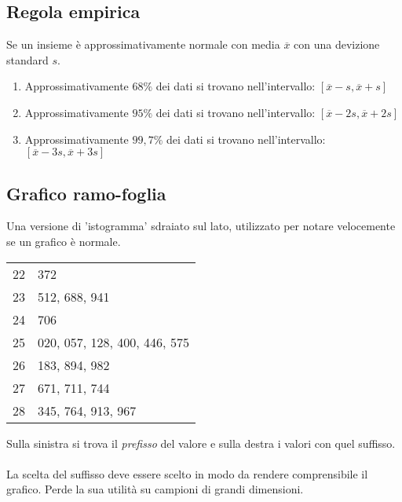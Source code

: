 \documentclass{article}
\begin{document}
\subsection*{Regola empirica}

Se un insieme è approssimativamente normale con media $\overline{x}$ con una devizione standard $s$.

\begin{enumerate}
  \item Approssimativamente $68\%$ dei dati si trovano nell'intervallo: $[\overline{x}-s,\overline{x}+s]$
  \item Approssimativamente $95\%$ dei dati si trovano nell'intervallo: $[\overline{x}-2s,\overline{x}+2s]$
  \item Approssimativamente $99,7\%$ dei dati si trovano nell'intervallo: $[\overline{x}-3s,\overline{x}+3s]$

\end{enumerate}


\subsection*{Grafico ramo-foglia}

Una versione di 'istogramma' sdraiato sul lato, utilizzato per notare velocemente se un grafico è normale.


\hfill

\begin{minipage}[c]{0.35\textwidth}
    \centering
    \begin{tabular}{r|l}
        22 & 372 \\
        23 & 512, 688, 941 \\
        24 & 706 \\
        25 & 020, 057, 128, 400, 446, 575 \\
        26 & 183, 894, 982 \\
        27 & 671, 711, 744 \\
        28 & 345, 764, 913, 967 \\
    \end{tabular}
\end{minipage}
\hspace{2mm}
\begin{minipage}[c]{0.6\textwidth}
    \vspace{-2mm}
    Sulla sinistra si trova il \textit{prefisso} del valore e sulla destra i valori con quel suffisso. \\ \\
    La scelta del suffisso deve essere scelto in modo da rendere comprensibile il grafico. Perde la sua utilità su campioni di grandi dimensioni.
\end{minipage}
\end{document}
